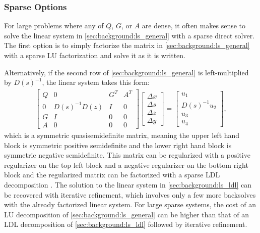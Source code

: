 \subsubsection{Sparse Options}
%
For large problems where any of $Q$, $G$, or $A$ are dense, it often makes sense to solve the linear system in \eqref{sec:background:ls_general} with a sparse direct solver. The first option is to simply factorize the matrix in \eqref{sec:background:ls_general} with a sparse LU factorization and solve it as it is written. 

Alternatively, if the second row of \eqref{sec:background:ls_general} is left-multiplied by $D(s)^{-1}$, the linear system takes this form:
%
\begin{align}
    \begin{bmatrix}
        Q & 0 & G^{T} & A^{T} \\
        0 & D(s)^{-1}D(z) & I & 0 \\
        G & I & 0 & 0 \\
        A & 0 & 0 & 0
    \end{bmatrix} 
    \begin{bmatrix}
        \Delta x \\
        \Delta s \\
        \Delta z \\
        \Delta y
    \end{bmatrix}
    = \begin{bmatrix}
        u_1 \\ D(s)^{-1} u_2 \\ u_3 \\ u_4
        \end{bmatrix} \label{sec:background:ls_ldl},
\end{align}
%
which is a symmetric quasisemidefinite matrix, meaning the upper left hand block is symmetric positive semidefinite and the lower right hand block is symmetric negative semidefinite. This matrix can be regularized with a positive regularizer on the top left block and a negative regularizer on the bottom right block and the regularized matrix can be factorized with a sparse LDL decomposition \cite{mattingley2012}. The solution to the linear system in \eqref{sec:background:ls_ldl} can be recovered with iterative refinement, which involves only a few more backsolves with the already factorized linear system. For large sparse systems, the cost of an LU decomposition of \eqref{sec:background:ls_general} can be higher than that of an LDL decomposition of \eqref{sec:background:ls_ldl} followed by iterative refinement. 
%
